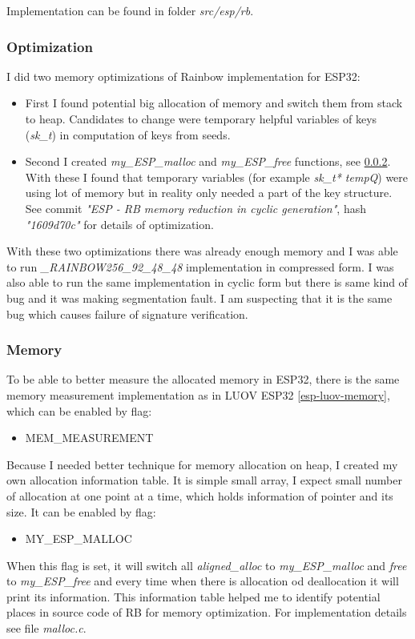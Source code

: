 \documentclass[thesis=M,english]{FITthesis}[2019/12/23]
\begin{document}
\bigskip
\noindent
Implementation can be found in folder \textit{src/esp/rb}. 

\subsubsection{Optimization} \label{rb-opti}
I did two memory optimizations of Rainbow implementation for ESP32:
\begin{itemize}
\item	First I found potential big allocation of memory and switch them from stack to heap. Candidates to change were temporary helpful variables of keys (\textit{sk\_t}) in computation of keys from seeds.

\item	Second I created \textit{my\_ESP\_malloc} and \textit{my\_ESP\_free} functions, see \ref{esp-rb-memory}. With these I found that temporary variables (for example \textit{sk\_t* tempQ}) were using lot of memory but in reality only needed a part of the key structure. See commit \textit{"ESP - RB memory reduction in cyclic generation"}, hash \textit{"1609d70c"} for details of optimization.
\end{itemize}

With these two optimizations there was already enough memory and I was able to run \textit{\_RAINBOW256\_92\_48\_48} implementation in compressed form. I was also able to run the same implementation in cyclic form but there is same kind of bug and it was making segmentation fault. I am suspecting that it is the same bug 
which causes failure of signature verification.

\subsubsection{Memory} \label{esp-rb-memory}
To be able to better measure the allocated memory in ESP32, there is the same memory measurement implementation as in LUOV ESP32 \ref{esp-luov-memory}, which can be enabled by flag:
\begin{itemize}
\item	MEM\_MEASUREMENT
\end{itemize}

Because I needed better technique for memory allocation on heap, I created my own allocation information table. It is simple small array, I expect small number of allocation at one point at a time, which holds information of pointer and its size.
It can be enabled by flag:
\begin{itemize}
\item	MY\_ESP\_MALLOC
\end{itemize}
When this flag is set, it will switch all \textit{aligned\_alloc} to \textit{my\_ESP\_malloc} and \textit{free} to \textit{my\_ESP\_free} and every time when there is allocation od deallocation it will print its information.
This information table helped me to identify potential places in source code of RB for memory optimization. For implementation details see file \textit{malloc.c}.
\end{document}
